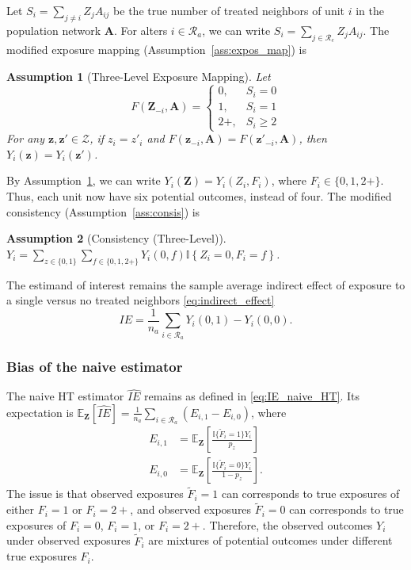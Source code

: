 \documentclass[11pt]{article}
\newtheorem{assumption}{Assumption}
\theoremstyle{definition}
\def \bz {\boldsymbol{z}}
\def \bZ {\boldsymbol{Z}}
\def \bA {\boldsymbol{A}}
\def \cR {\mathcal{R}}
\def \EX {\mathbb{E}}
\begin{document}
Let $S_i = \sum_{j\neq i} Z_jA_{ij}$ be the true number of 
treated neighbors of unit $i$ in the population network $\bA$. 
For alters $i \in \cR_a$, we can write $S_i = \sum_{j \in \cR_e} Z_jA_{ij}$.
The modified exposure mapping (Assumption~\ref{ass:expos_map}) is
\begin{assumption}[Three-Level Exposure Mapping]
\label{apdx.ass:expos_map_three_level}
    Let
    \begin{equation*}
        F(\bZ_{-i},\bA) =
        \begin{cases}
            0, & S_i = 0 \\
            1, & S_i = 1 \\
            2+, & S_i \ge 2
        \end{cases}
    \end{equation*}
    For any $\bz, \bz' \in \mathcal{Z}$, 
    if $z_i = z'_i$ and $F(\bz_{-i},\bA) = F(\bz'_{-i},\bA)$, then $Y_i(\bz) = Y_i(\bz')$.
\end{assumption}
By Assumption~\ref{apdx.ass:expos_map_three_level}, we can write $Y_i(\bZ) = Y_i(Z_i, F_i)$, where $F_i \in \{0, 1, 2+\}$.
Thus, each unit now have six potential outcomes, instead of four.
The modified consistency (Assumption~\ref{ass:consis}) is
\begin{assumption}[Consistency (Three-Level)]
\label{apdx.ass:consis_three_level}
$Y_i = \sum_{z \in \{0,1\}}\sum_{f \in \{0, 1, 2+\}}Y_i(0,f) \mathbb{I}\left\{Z_i=0, F_i=f\right\}$.
\end{assumption}
The estimand of interest remains the sample average indirect effect 
of exposure to a single versus no treated neighbors \eqref{eq:indirect_effect}
\begin{equation*}
    IE = \frac{1}{n_a} \sum_{i\in\cR_a} Y_i(0, 1) - Y_i(0,0).
\end{equation*}

\subsubsection*{Bias of the naive estimator}
The naive HT estimator $\widehat{IE}$ remains as defined in \eqref{eq:IE_naive_HT}. Its expectation is $\EX_{\bZ}\left[\widehat{IE}\right] = \frac{1}{n_a} \sum_{i \in \cR_a} \left( E_{i,1} - E_{i,0} \right)$, where
\begin{align*}
    E_{i,1} &= \EX_{\bZ}\left[\frac{\mathbb{I}\{\widetilde{F}_i=1\}Y_i}{p_z} \right] \\
    E_{i,0} &= \EX_{\bZ}\left[\frac{\mathbb{I}\{\widetilde{F}_i=0\}Y_i}{1-p_z} \right].
\end{align*}
The issue is that observed exposures $\widetilde{F}_i=1$ 
can corresponds to true exposures of either $F_i=1$ or $F_i=2+$,
and observed exposures $\widetilde{F}_i=0$ can corresponds to true exposures of $F_i=0$, $F_i=1$, or $F_i=2+$.
Therefore, the observed outcomes $Y_i$ under observed exposures 
    $\widetilde{F}_i$ are mixtures of potential outcomes under different true exposures $F_i$.
\end{document}
